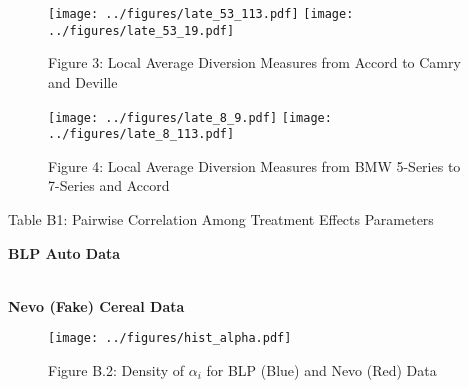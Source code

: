 \documentclass[6pt,twoside]{article}
\begin{document}
\begin{figure}[htbp]
\begin{center}
\caption*{Figure 3: Local Average Diversion Measures from Accord to Camry and Deville}
\texttt{[image: ../figures/late\_53\_113.pdf]}
\texttt{[image: ../figures/late\_53\_19.pdf]}
\end{center}
\end{figure}

\begin{figure}[htbp]
\begin{center}
\caption*{Figure 4: Local Average Diversion Measures from BMW 5-Series to 7-Series and Accord}
\texttt{[image: ../figures/late\_8\_9.pdf]}
\texttt{[image: ../figures/late\_8\_113.pdf]}
\end{center}
\end{figure}




\begin{table}[htp]
\footnotesize
\caption*{Table B1: Pairwise Correlation Among Treatment Effects Parameters}
\caption*{\textbf{BLP Auto Data}}
\begin{center}
\\
\caption*{\textbf{Nevo (Fake) Cereal Data}}

\end{center}
\end{table}%

\footnotesize{
}

\clearpage
\begin{figure}[htbp]
\begin{center}
\caption*{Figure B.2: Density of $\alpha_i$ for BLP (Blue) and Nevo (Red) Data}
\texttt{[image: ../figures/hist\_alpha.pdf]}
\end{center}
\end{figure}
\end{document}
